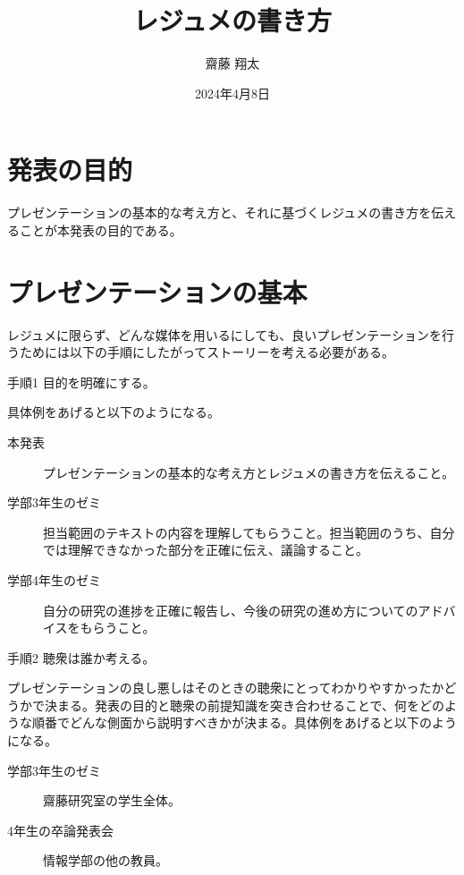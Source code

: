 \documentclass[a4j]{jsarticle}
\title{レジュメの書き方}
\author{齋藤 翔太}
\date{2024年4月8日}
\begin{document}
\maketitle

\section*{発表の目的}
プレゼンテーションの基本的な考え方と、それに基づくレジュメの書き方を伝えることが本発表の目的である。


\tableofcontents

\clearpage

\section{プレゼンテーションの基本}
レジュメに限らず、どんな媒体を用いるにしても、良いプレゼンテーションを行うためには以下の手順にしたがってストーリーを考える必要がある。

\begin{itembox}[l]{手順1}
目的を明確にする。
\end{itembox}

具体例をあげると以下のようになる。

\begin{description}
\item[本発表]プレゼンテーションの基本的な考え方とレジュメの書き方を伝えること。
\item[学部3年生のゼミ]担当範囲のテキストの内容を理解してもらうこと。担当範囲のうち、自分では理解できなかった部分を正確に伝え、議論すること。
\item[学部4年生のゼミ]自分の研究の進捗を正確に報告し、今後の研究の進め方についてのアドバイスをもらうこと。
\end{description}

\begin{itembox}[l]{手順2}
聴衆は誰か考える。
\end{itembox}

プレゼンテーションの良し悪しはそのときの聴衆にとってわかりやすかったかどうかで決まる。発表の目的と聴衆の前提知識を突き合わせることで、何をどのような順番でどんな側面から説明すべきかが決まる。具体例をあげると以下のようになる。

\begin{description}
\item[学部3年生のゼミ] 齋藤研究室の学生全体。
\item[4年生の卒論発表会] 情報学部の他の教員。
\end{description}
\end{document}
